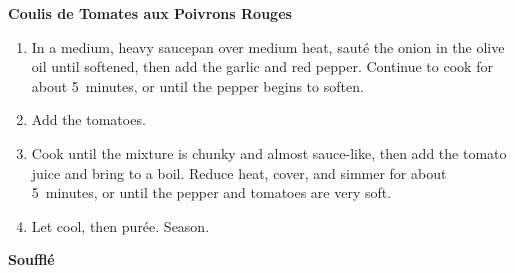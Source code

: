 

\textbf{Coulis de Tomates aux Poivrons Rouges}

\begin{ingredients}
\end{ingredients}


\begin{recipe}
  \begin{enumerate}

  \item In a medium, heavy saucepan over medium heat, saut\'e the
    onion in the olive oil until softened, then add the garlic and red
    pepper.  Continue to cook for about 5~minutes, or until the pepper
    begins to soften.

  \item Add the tomatoes.

  \item Cook until the mixture is chunky and almost sauce-like, then
    add the tomato juice and bring to a boil.  Reduce heat, cover, and
    simmer for about 5~minutes, or until the pepper and tomatoes are
    very soft.

  \item Let cool, then pur\'ee.  Season.

  \end{enumerate}
\end{recipe}


\textbf{Souffl\'e}

\begin{ingredients}
\end{ingredients}


